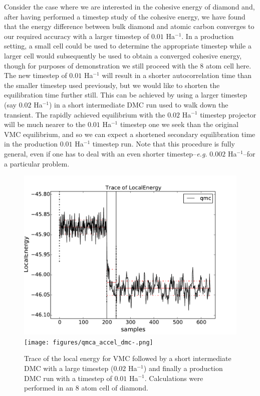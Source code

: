 Consider the case where we are interested in the cohesive energy of 
diamond and, after having performed a timestep study of the cohesive 
energy, we have found that the energy difference between bulk diamond 
and atomic carbon converges to our required accuracy with a larger 
timestep of $0.01$ Ha$^{-1}$.  In a production setting, a small cell 
could be used to determine  the appropriate timestep while a larger 
cell would subsequently be used to obtain a converged cohesive energy, 
though for purposes of demonstration we still proceed with the 8 atom 
cell here.  The new timestep of $0.01$ Ha$^{-1}$ will result in a shorter 
autocorrelation time than the smaller timestep used previously, but 
we would like to shorten the equilibration time further still.  This 
can be achieved by using a larger timestep (say $0.02$ Ha$^{-1}$) in a 
short intermediate DMC run used to walk down the transient.  The 
rapidly achieved equilibrium with the $0.02$ Ha$^{-1}$ timestep 
projector will be much nearer to the $0.01$ Ha$^{-1}$ timestep one 
we seek than the original VMC equilibrium, and so we can expect 
a shortened secondary equilibration time in the production 
$0.01$ Ha$^{-1}$ timestep run. Note that this procedure is fully 
general, even if one has to deal with an even shorter 
timestep--\emph{e.g.} $0.002$ Ha$^{-1}$--for a particular problem.

\begin{figure}
\begin{center}
\ifpdf
\includegraphics[trim = 0mm 0mm 0mm 0mm, clip,width=0.75\columnwidth]{figures/qmca_accel_dmc.pdf}
\else
\texttt{[image: figures/qmca\_accel\_dmc-.png]}
\fi
\end{center}
\caption{Trace of the local energy for VMC followed by a short intermediate DMC with a large timestep ($0.02$ Ha$^{-1}$) and finally a production DMC run with a timestep of $0.01$ Ha$^{-1}$.  Calculations were performed in an 8 atom cell of diamond.} 
\label{fig:qmca_accel_dmc}
\end{figure}

